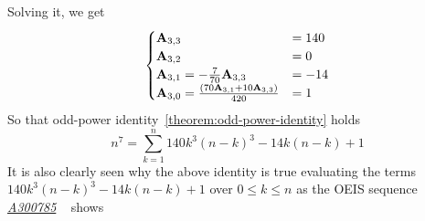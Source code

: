 \begin{example}
    Solving it, we get
    \begin{equation*}
        \begin{cases}
            {\mathbf{A}} \sb{3,3} &= 140 \\
            {\mathbf{A}} \sb{3,2} &= 0 \\
            {\mathbf{A}} \sb{3,1} = -\frac{7}{70} {\mathbf{A}} \sb{3,3} &= -14 \\
            {\mathbf{A}} \sb{3,0} = \frac{(70 {\mathbf{A}} \sb{3,1} + 10 {\mathbf{A}} \sb{3,3})}{420} &= 1
        \end{cases}
    \end{equation*}
    So that odd-power identity~\eqref{theorem:odd-power-identity} holds
    \begin{equation*}
        n^7 = \sum_{k=1}^{n} 140 k^3 (n-k)^3 - 14k(n-k) + 1
    \end{equation*}
    It is also clearly seen
    why the above identity is true evaluating the terms $140 k^3 (n-k)^3 - 14k(n-k) + 1$ over $0 \leq k \leq n$ as
    the OEIS sequence \href{https://oeis.org/A300785}{\textit{A300785}}
    ~\cite{oeis_numerical_triangle_row_sums_give_seventh_powers} shows
    
\end{example}

